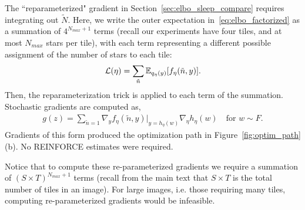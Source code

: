 The ``reparameterized" gradient in Section~\ref{sec:elbo_sleep_compare} requires integrating out $\tilde N$.
Here, we write the outer expectation in~\eqref{eq:elbo_factorized} as a summation of $4^{N_{max}+1}$ terms
(recall our experiments have four tiles, and at most $N_{max}$ stars per tile), 
with each term representing a different possible 
assignment of the number of stars to each tile: 
\begin{align}
\mathcal{L}(\eta) = \sum_{\tilde n}\mathbb{E}_{q_\eta(y)}[f_\eta(\tilde n, y)].
\end{align}
Then, the reparameterization trick is applied to each term of the summation.
Stochastic gradients are computed as,
\begin{align}
g(z) = \sum_{\tilde n=1}\nabla_y f_\eta(\tilde n, y)\Big|_{y = h_\eta(w)}
\nabla_\eta h_\eta(w) \quad \text{for } w\sim F.
\end{align}
Gradients of this form produced the optimization path in Figure~\ref{fig:optim_path}(b).
No REINFORCE estimates were required. 

Notice that to compute these re-parameterized gradients we require 
a summation of $(S \times T)^{N_{max}+1}$ terms 
(recall from the main text that $S \times T$ is the total number 
of tiles in an image). 
For large images, i.e. those requiring many tiles, computing re-parameterized gradients would be infeasible. 

